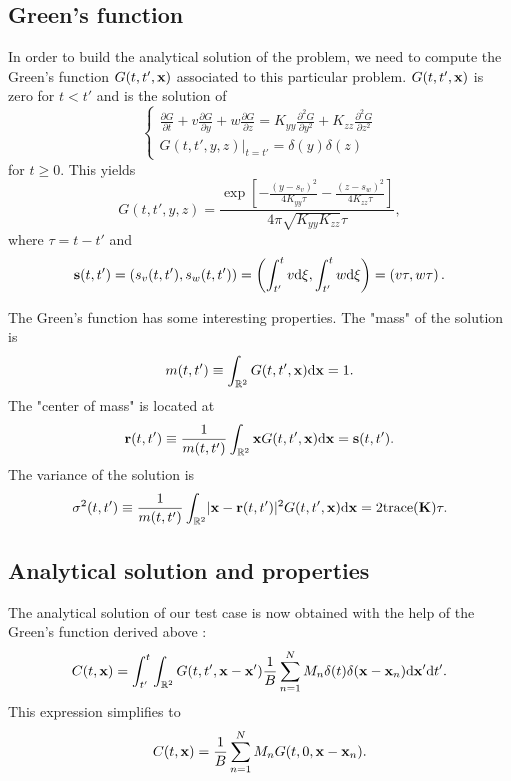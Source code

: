 \subsection*{Green's function}
In order to build the analytical solution of the problem, we need to compute the Green's function $\G$ associated to this particular problem. $\G$ is zero for $t<t'$ and is the solution of
\begin{equation}
	\begin{cases}
		\frac{\partial G}{\partial t} + v \frac{\partial G}{\partial y} + w\frac{\partial G}{\partial z} = K_{yy}\frac{\partial^2 G}{\partial y^2} + K_{zz}\frac{\partial^2 G}{\partial z^2}\\[.1cm]
		\left. G(t,t',y,z) \right \rvert_{t=t'} = \delta(y)\delta(z) 
	\end{cases}
\end{equation}
for $t \ge 0$. This yields
\begin{equation} 
	G(t,t',y,z) = \frac{\exp\left[-\frac{(y-s_v)^2}{4K_{yy}\tau} -\frac{(z-s_w)^2}{4K_{zz}\tau} \right]}{4\pi\sqrt{K_{yy}K_{zz}}\tau},
\end{equation}
where $\tau = t-t'$ and 
\begin{equation}
	\b s(t,t') = (s_v(t,t'), s_w(t,t')) = \left(\int_{t'}^{t}v \rm d \xi, \int_{t'}^{t}w \rm d \xi \right) = \left(v\tau, w\tau\right).
\end{equation}

The Green's function has some interesting properties. The "mass" of the solution is
\begin{equation} \label{eq:testcase:propmass}
	m(t,t') \equiv \int_{\R[2]} \G \rm d \b x = 1.
\end{equation}
The "center of mass" is located at
\begin{equation} \label{eq:testcase:propcenter}
	\b r(t,t') \equiv \frac{1}{m(t,t')} \int_{\R[2]} \b x \G \rm d \b x  = \b s(t,t').
\end{equation}
The variance of the solution is
\begin{equation} \label{eq:testcase:propvar}
	\sigma^2(t,t') \equiv \frac{1}{m(t,t')} \int_{\R[2]} \lvert \b x - \b r(t,t') \rvert^2 \G \rm d \b x = 2 \rm{trace}(\b K) \tau.
\end{equation}

\subsection*{Analytical solution and properties}
The analytical solution of our test case is now obtained with the help of the Green's function derived above :
\begin{equation}
	C(t,\b x) = \int_{t'}^{t} \int_{\R[2]} G(t,t',\b x - \b x') \frac{1}{B} \sum_{n=1}^{N} M_n \delta(t) \delta(\b x- \b x_n) \rm d \b{x}' \rm dt'.
\end{equation}
This expression simplifies to
\begin{equation}
	C(t,\b x) = \frac{1}{B} \sum_{n=1}^{N} M_n G(t,0,\b x - \b x_n).
\end{equation}

